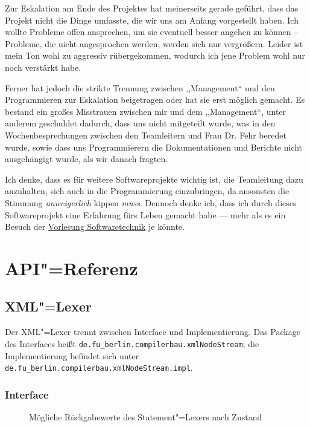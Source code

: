 \documentclass[10pt,a4paper,ngerman,titlepage,tocindentauto]{scrartcl}
\newcommand{\n}{\linebreak[1]}
\begin{document}
		Zur Eskalation am Ende des Projektes hat meinerseits gerade geführt, dass das Projekt nicht die Dinge umfasste,
		die wir uns am Anfang vorgestellt haben. Ich wollte Probleme offen ansprechen, um sie eventuell besser angehen zu
		können -- Probleme, die nicht angesprochen werden, werden sich nur vergrößern. Leider ist mein Ton wohl zu aggressiv
		rübergekommen, wodurch ich jene Problem wohl nur noch verstärkt habe.
		
		Ferner hat jedoch die strikte Trennung zwischen ,,Management`` und den Programmieren zur Eskalation beigetragen
		oder hat sie erst möglich gemacht. Es bestand ein großes Misstrauen zwischen mir und dem ,,Management``,
		unter anderem geschuldet dadurch, dass uns nicht mitgeteilt wurde, was in den Wochenbesprechungen zwischen den
		Teamleitern und Frau Dr. Fehr beredet wurde, sowie dass uns Programmierern die Dokumentationen und Berichte
		nicht ausgehängigt wurde, als wir danach fragten.
		
		Ich denke, dass es für weitere Softwareprojekte wichtig ist, die Teamleitung dazu anzuhalten, sich auch in die
		Programmierung einzubringen, da ansonsten die Stimmung {\em unweigerlich} kippen {\em muss}. Dennoch denke ich,
		dass ich durch dieses Softwareprojekt eine Erfahrung fürs Leben gemacht habe --- mehr als es ein Besuch der
		\href{https://www.inf.fu-berlin.de/w/SE/VorlesungSoftwaretechnik2008}{Vorlesung Softwaretechnik} je könnte.
		
	\section{API"=Referenz}
		\subsection[XML-Lexer]{\hypertarget{XML-Lexer-API}{XML"=Lexer}}
			Der XML"=Lexer trennt zwischen Interface und Implementierung.
			Das Package des Interfaces heißt \texttt{de.{\n}fu\_berlin.{\n}compilerbau.{\n}xml\-Node\-Stream};
			die Implementierung befindet sich unter \texttt{de.{\n}fu\_berlin.{\n}compilerbau.{\n}xml\-Node\-Stream.{\n}impl}.
			
			\subsubsection*{Interface}
				\begin{wrapfigure}{R}{0.3\textwidth}
					\caption{Mög\-li\-che Rück\-ga\-be\-wer\-te des State\-ment"=Le\-xers nach Zu\-stand}
				\end{wrapfigure}
				
\end{document}
